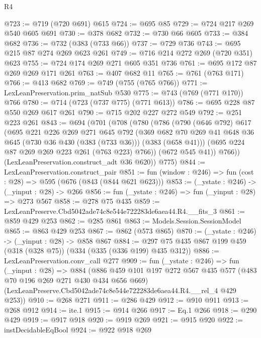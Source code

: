 \begin{lexlean}{R4}
\begin{coremodule}
@723 := @719 (@720 @691) @615
@724 := @695 @85
@729 := @724 @217 @269 @540 @605 @691
@730 := @378 @682
@732 := @730 @66 @605
@733 := @384 @682
@736 := @732 (@383 (@733 @66))
@737 := @729 @736
@743 := @695 @215 @87 @274 @269 @623 @261
@749 := @716 @214 @272 @269 (@720 @351) @623
@755 := @724 @174 @269 @271 @605 @351 @736
@761 := @695 @172 @87 @269 @269 @171 @261
@763 := @407 @682 @11
@765 := @761 (@763 @171)
@766 := @413 @682
@769 := @749 (@755 (@765 @766))
@771 := LexLeanPreservation.prim_natSub @530
@775 := @743 (@769 (@771 @170)) @766
@780 := @714 (@723 (@737 @775) (@771 @613))
@786 := @695 @228 @87 @550 @269 @617 @261
@790 := @715 @202 @227 @272 @549
@792 := @251 @223 @261
@843 := @694
    (@701
      (@708
        (@780
          (@786
            (@790
              (@646 @792)
              @617
              (@695
                @221
                @226
                @269
                @271
                @645
                @792
                (@369
                  @682
                  @70
                  @269
                  @41
                  @648
                  @36
                  @645
                  (@730 @36 @430 (@383 (@733 @36)))
                  (@383 (@658 @41)))
                (@695 @224 @87 @269 @269 @223 @261 (@763 @223) @766))
              (@672 @545 @41))
            @766))
        (LexLeanPreservation.construct_adt @36 @620))
      @775)
@844 := LexLeanPreservation.construct_pair
@851 := fun (window : @246) => fun (cost : @28) => @595 (@676 (@843 (@844 @621 @623)))
@853 := (_ystate : @246) -> (_yinput : @28) -> @266
@856 := fun (_ystate : @246) => fun (_yinput : @28) => @273 @567
@858 := @278 @75 @435
@859 := LexLeanPreserve.Cbd5042ade74c8e544e722283de6aea44.R4.__fits_3
@861 := @859 @429 @253
@862 := @285 @861
@863 := Models.Session.SessionModel
@865 := @863 @429 @253
@867 := @862 (@573 @865)
@870 := (_ystate : @246) -> (_yinput : @28) -> @858 @867
@884 := @297 @75 @435 @867 @199 @459 (@318 (@328 @75)) (@334 (@335 (@336 @199) @435 @312))
@886 := LexLeanPreservation.conv_call @277
@909 := fun (_ystate : @246) =>
  fun (_yinput : @28) =>
  @884
    (@886
      @459
      @101
      @197
      @272
      @567
      @435
      @577
      (@483 @70 @196 @269 @271 @430 @434 @656 @669)
      (LexLeanPreserve.Cbd5042ade74c8e544e722283de6aea44.R4.__rel_4 @429 @253))
@910 := @268 @271
@911 := @286 @429
@912 := @910 @911
@913 := @268 @912
@914 := ite.{1}
@915 := @914 @266
@917 := Eq.{1} @266
@918 := @290 @429
@919 := @917 @918
@920 := @919 @269
@921 := @915 @920
@922 := instDecidableEqBool
@924 := @922 @918 @269

\end{coremodule}
\end{lexlean}

